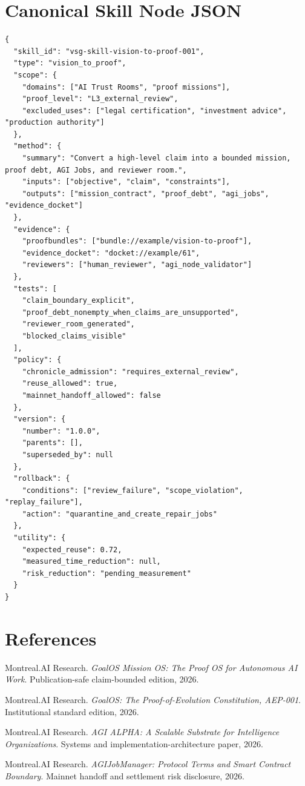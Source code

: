 \documentclass[10.5pt,oneside]{article}
\begin{document}
\section{Canonical Skill Node JSON}
\begin{lstlisting}[style=jsonstyle]
{
  "skill_id": "vsg-skill-vision-to-proof-001",
  "type": "vision_to_proof",
  "scope": {
    "domains": ["AI Trust Rooms", "proof missions"],
    "proof_level": "L3_external_review",
    "excluded_uses": ["legal certification", "investment advice", "production authority"]
  },
  "method": {
    "summary": "Convert a high-level claim into a bounded mission, proof debt, AGI Jobs, and reviewer room.",
    "inputs": ["objective", "claim", "constraints"],
    "outputs": ["mission_contract", "proof_debt", "agi_jobs", "evidence_docket"]
  },
  "evidence": {
    "proofbundles": ["bundle://example/vision-to-proof"],
    "evidence_docket": "docket://example/61",
    "reviewers": ["human_reviewer", "agi_node_validator"]
  },
  "tests": [
    "claim_boundary_explicit",
    "proof_debt_nonempty_when_claims_are_unsupported",
    "reviewer_room_generated",
    "blocked_claims_visible"
  ],
  "policy": {
    "chronicle_admission": "requires_external_review",
    "reuse_allowed": true,
    "mainnet_handoff_allowed": false
  },
  "version": {
    "number": "1.0.0",
    "parents": [],
    "superseded_by": null
  },
  "rollback": {
    "conditions": ["review_failure", "scope_violation", "replay_failure"],
    "action": "quarantine_and_create_repair_jobs"
  },
  "utility": {
    "expected_reuse": 0.72,
    "measured_time_reduction": null,
    "risk_reduction": "pending_measurement"
  }
}
\end{lstlisting}

\section{References}
\begin{enumerate}[label={[\arabic*]},leftmargin=1.4em]
  \item Montreal.AI Research. \textit{GoalOS Mission OS: The Proof OS for Autonomous AI Work}. Publication-safe claim-bounded edition, 2026.
  \item Montreal.AI Research. \textit{GoalOS: The Proof-of-Evolution Constitution, AEP-001}. Institutional standard edition, 2026.
  \item Montreal.AI Research. \textit{AGI ALPHA: A Scalable Substrate for Intelligence Organizations}. Systems and implementation-architecture paper, 2026.
  \item Montreal.AI Research. \textit{AGIJobManager: Protocol Terms and Smart Contract Boundary}. Mainnet handoff and settlement risk disclosure, 2026.
\end{enumerate}
\end{document}
